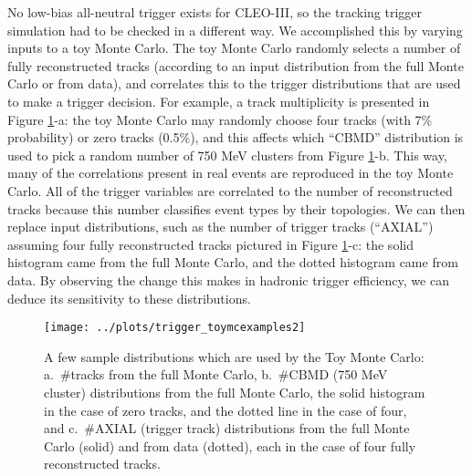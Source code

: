 \documentclass[aps,prd,preprint,superscriptaddress,tightenlines,nofootinbib,floatfix]{revtex4}
\begin{document}
No low-bias all-neutral trigger exists for CLEO-III, so the tracking
trigger simulation had to be checked in a different way.  We
accomplished this by varying inputs to a toy Monte Carlo.  The toy
Monte Carlo randomly selects a number of fully reconstructed tracks
(according to an input distribution from the full Monte Carlo or from
data), and correlates this to the trigger distributions that are used
to make a trigger decision.  For example, a track multiplicity is
presented in Figure \ref{fig:toymcexamples}-a: the toy Monte Carlo may
randomly choose four tracks (with 7\% probability) or zero tracks
(0.5\%), and this affects which ``CBMD'' distribution is used to pick
a random number of 750 MeV clusters from Figure
\ref{fig:toymcexamples}-b.  This way, many of the correlations present
in real events are reproduced in the toy Monte Carlo.  All of the
trigger variables are correlated to the number of reconstructed tracks
because this number classifies event types by their topologies.  We
can then replace input distributions, such as the number of trigger
tracks (``AXIAL'') assuming four fully reconstructed tracks pictured
in Figure \ref{fig:toymcexamples}-c: the solid histogram came from the
full Monte Carlo, and the dotted histogram came from data.  By
observing the change this makes in hadronic trigger efficiency, we can
deduce its sensitivity to these distributions.

\begin{figure}[t]
  \begin{center}
    \texttt{[image: ../plots/trigger\_toymcexamples2]}
  \end{center}
  \vspace{-1.3 cm}
  \caption{\label{fig:toymcexamples} A few sample distributions which
    are used by the Toy Monte Carlo: a.\ \#tracks from the full Monte
    Carlo, b.\ \#CBMD (750 MeV cluster) distributions from the full
    Monte Carlo, the solid histogram in the case of zero tracks, and
    the dotted line in the case of four, and c.\ \#AXIAL (trigger
    track) distributions from the full Monte Carlo (solid) and from
    data (dotted), each in the case of four fully reconstructed
    tracks.}
\end{figure}
\end{document}

